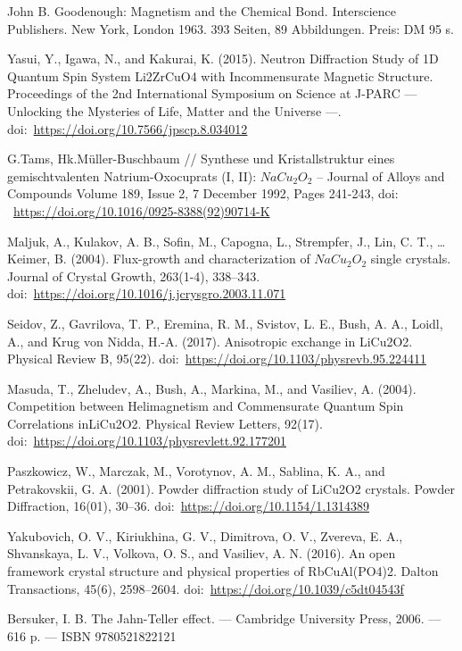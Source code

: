 \documentclass[11pt]{article}
\begin{document}
\begin{thebibliography}{3}
John B. Goodenough: Magnetism and the Chemical Bond. Interscience Publishers. New York, London 1963. 393 Seiten, 89 Abbildungen. Preis: DM 95 s.

Yasui, Y., Igawa, N., and Kakurai, K. (2015). Neutron Diffraction Study of 1D Quantum Spin System Li2ZrCuO4 with Incommensurate Magnetic Structure. Proceedings of the 2nd International Symposium on Science at J-PARC — Unlocking the Mysteries of Life, Matter and the Universe —. doi:~\url{https://doi.org/10.7566/jpscp.8.034012}

G.Tams, Hk.Müller-Buschbaum // Synthese und Kristallstruktur eines gemischtvalenten Natrium-Oxocuprats (I, II): $NaCu_2O_2$ -- Journal of Alloys and Compounds Volume 189, Issue 2, 7 December 1992, Pages 241-243, doi: ~\url{https://doi.org/10.1016/0925-8388(92)90714-K}

Maljuk, A., Kulakov, A. B., Sofin, M., Capogna, L., Strempfer, J., Lin, C. T., … Keimer, B. (2004). Flux-growth and characterization of $NaCu_2O_2$ single crystals. Journal of Crystal Growth, 263(1-4), 338–343. doi:~\url{https://doi.org/10.1016/j.jcrysgro.2003.11.071}

Seidov, Z., Gavrilova, T. P., Eremina, R. M., Svistov, L. E., Bush, A. A., Loidl, A., and Krug von Nidda, H.-A. (2017). Anisotropic exchange in LiCu2O2. Physical Review B, 95(22). doi:~\url{https://doi.org/10.1103/physrevb.95.224411}

Masuda, T., Zheludev, A., Bush, A., Markina, M., and Vasiliev, A. (2004). Competition between Helimagnetism and Commensurate Quantum Spin Correlations inLiCu2O2. Physical Review Letters, 92(17). doi:~\url{https://doi.org/10.1103/physrevlett.92.177201}

Paszkowicz, W., Marczak, M., Vorotynov, A. M., Sablina, K. A., and Petrakovskii, G. A. (2001). Powder diffraction study of LiCu2O2 crystals. Powder Diffraction, 16(01), 30–36. doi:~\url{https://doi.org/10.1154/1.1314389}

Yakubovich, O. V., Kiriukhina, G. V., Dimitrova, O. V., Zvereva, E. A., Shvanskaya, L. V., Volkova, O. S., and Vasiliev, A. N. (2016). An open framework crystal structure and physical properties of RbCuAl(PO4)2. Dalton Transactions, 45(6), 2598–2604. doi:~\url{https://doi.org/10.1039/c5dt04543f} 

Bersuker, I. B. The Jahn-Teller effect. — Cambridge University Press, 2006. — 616 p. — ISBN 9780521822121


\end{thebibliography}
\end{document}
